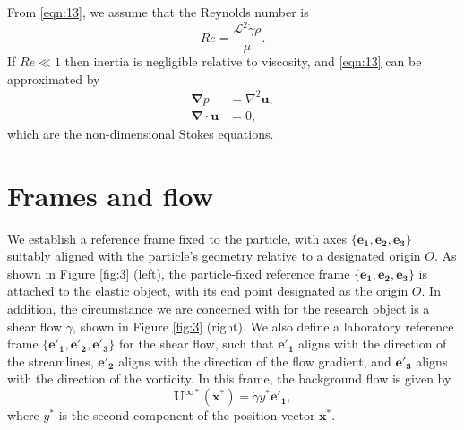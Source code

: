 \documentclass[12pt,MSc,twoside]{muthesis_2020}
\begin{document}
From \eqref{eqn:13}, we assume that the Reynolds number is 
\begin{equation}
\label{eqn:14}  
Re=\frac{\mathcal{L}^2\dot{\gamma}\rho}{\mu}.
\end{equation}
If $Re \ll 1$ then inertia is negligible relative to viscosity, and \eqref{eqn:13} can be approximated by 
\begin{equation}
\label{eqn:15}
\begin{aligned}
\bm{\nabla} p&=\nabla^{2}\mathbf{u},\\
\bm{\nabla}\cdot\mathbf{u}&=0,
\end{aligned}
\end{equation}
which are the non-dimensional Stokes equations. 





\section{Frames and flow}
We establish a reference frame fixed to the particle, with axes $\{\mathbf{e_1},\mathbf{e_2},\mathbf{e_3}\}$ suitably aligned with the particle's geometry relative to a designated origin $O$. As shown in Figure \ref{fig:3} (left), the particle-fixed reference frame $\{\mathbf{e_1},\mathbf{e_2},\mathbf{e_3}\}$ is attached to the elastic object, with its end point designated as the origin $O$. In addition, the circumstance we are concerned with for the research object is a shear flow $\dot{\gamma}$, shown in Figure \ref{fig:3} (right). We also define a laboratory reference frame $\{\mathbf{e'_1},\mathbf{e'_2},\mathbf{e'_3}\}$ for the shear flow, such that $\mathbf{e'_1}$ aligns with the direction of the streamlines, $\mathbf{e'_2}$ aligns with the direction of the flow gradient, and $\mathbf{e'_3}$ aligns with the direction of the vorticity. In this frame, the background flow is given by 
\begin{equation}
\label{eqn:104}
    \mathbf{U}^{\infty*}(\mathbf{x}^*)=\dot{\gamma}y^*\mathbf{e'_1},
\end{equation}
where $y^*$ is the second component of the position vector $\mathbf{x}^*$. 
\end{document}
